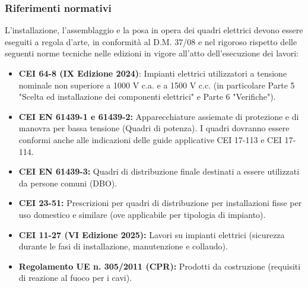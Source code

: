 \subsubsection{Riferimenti normativi}
L'installazione, l'assemblaggio e la posa in opera dei quadri elettrici devono essere eseguiti a regola d'arte, in conformità al D.M. 37/08 e nel rigoroso rispetto delle seguenti norme tecniche nelle edizioni in vigore all'atto dell'esecuzione dei lavori:


\begin{itemize}
\item \textbf{CEI 64-8 (IX Edizione 2024)}: Impianti elettrici utilizzatori a tensione nominale non superiore a 1000 V c.a. e a 1500 V c.c. (in particolare Parte 5 "Scelta ed installazione dei componenti elettrici" e Parte 6 "Verifiche").
\item \textbf{CEI EN 61439-1 e 61439-2:} Apparecchiature assiemate di protezione e di manovra per bassa tensione (Quadri di potenza). I quadri dovranno essere conformi anche alle indicazioni delle guide applicative CEI 17-113 e CEI 17-114.
\item \textbf{CEI EN 61439-3:} Quadri di distribuzione finale destinati a essere utilizzati da persone comuni (DBO).
\item \textbf{CEI 23-51:} Prescrizioni per quadri di distribuzione per installazioni fisse per uso domestico e similare (ove applicabile per tipologia di impianto).
\item \textbf{CEI 11-27 (VI Edizione 2025):} Lavori su impianti elettrici (sicurezza durante le fasi di installazione, manutenzione e collaudo).
\item \textbf{Regolamento UE n. 305/2011 (CPR):} Prodotti da costruzione (requisiti di reazione al fuoco per i cavi).
\end{itemize}

